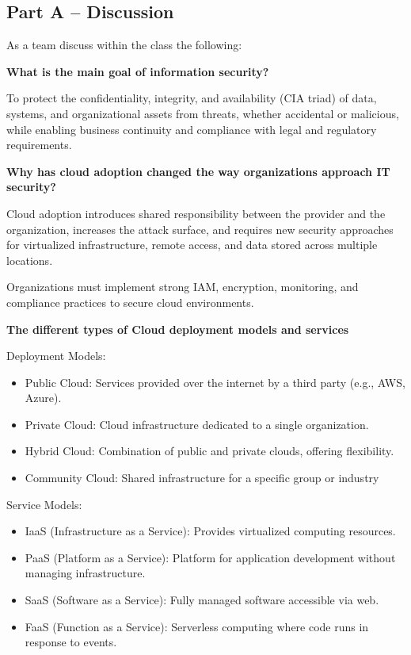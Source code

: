 \subsection{Part A – Discussion}

\indent 

As a team discuss within the class the following:

\noindent\textbf{What is the main goal of information security?}

To protect the confidentiality, integrity, and availability (CIA triad) of data, systems, and organizational assets from threats, whether accidental or malicious, while enabling business continuity and compliance with legal and regulatory requirements.

\noindent\textbf{Why has cloud adoption changed the way organizations approach IT security?}

Cloud adoption introduces shared responsibility between the provider and the organization, increases the attack surface, and requires new security approaches for virtualized infrastructure, remote access, and data stored across multiple locations. 

Organizations must implement strong IAM, encryption, monitoring, and compliance practices to secure cloud environments.

\noindent\textbf{The different types of Cloud deployment models and services}

Deployment Models:

\begin{itemize}
    \item Public Cloud: Services provided over the internet by a third party (e.g., AWS, Azure).
    \item Private Cloud: Cloud infrastructure dedicated to a single organization.
    \item Hybrid Cloud: Combination of public and private clouds, offering flexibility.
    \item Community Cloud: Shared infrastructure for a specific group or industry
\end{itemize}

Service Models:

\begin{itemize}
    \item IaaS (Infrastructure as a Service): Provides virtualized computing resources.
    \item PaaS (Platform as a Service): Platform for application development without managing infrastructure.
    \item SaaS (Software as a Service): Fully managed software accessible via web.
    \item FaaS (Function as a Service): Serverless computing where code runs in response to events.
\end{itemize}

